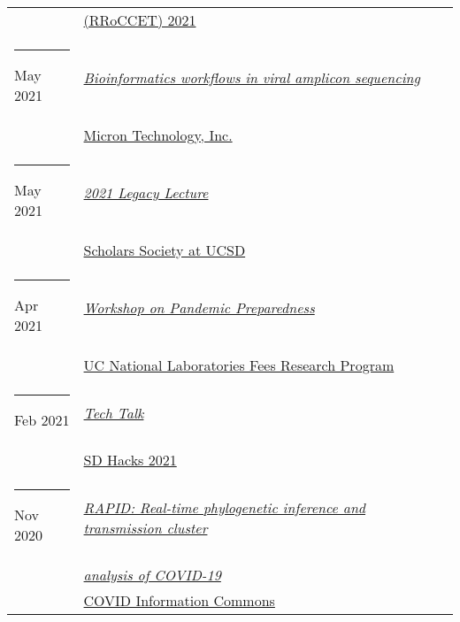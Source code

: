 \documentclass[margin,line]{res}
\begin{document}
\begin{resume}
\begin{longtable}{@{}p{0.7in}p{4in}}
\hspace*{-4mm} & \hspace{4mm} \href{https://na.eventscloud.com/website/23042/}{(RRoCCET) 2021}\\
\hspace*{-4mm} \rule{-1mm}{5mm} May 2021 & \href{https://www.micron.com/}{\textit{Bioinformatics workflows in viral amplicon sequencing}}\\*
\hspace*{-4mm} & \hspace{4mm} \href{https://www.micron.com/}{Micron Technology, Inc.}\\
\hspace*{-4mm} \rule{-1mm}{5mm} May 2021 & \href{https://studentorg.ucsd.edu/Home/Details/12340}{\textit{2021 Legacy Lecture}}\\*
\hspace*{-4mm} & \hspace{4mm} \href{https://studentorg.ucsd.edu/Home/Details/12340}{Scholars Society at UCSD}\\
\hspace*{-4mm} \rule{-1mm}{5mm} Apr 2021 & \href{https://www.ucop.edu/research-initiatives/programs/lab-fees/workshops.html}{\textit{Workshop on Pandemic Preparedness}}\\*
\hspace*{-4mm} & \hspace{4mm} \href{https://www.ucop.edu/research-initiatives/programs/lab-fees/index.html}{UC National Laboratories Fees Research Program}\\
\hspace*{-4mm} \rule{-1mm}{5mm} Feb 2021 & \href{https://www.sdhacks.io/}{\textit{Tech Talk}}\\*
\hspace*{-4mm} & \hspace{4mm} \href{https://www.sdhacks.io/}{SD Hacks 2021}\\
\hspace*{-4mm} \rule{-1mm}{5mm} Nov 2020 & \href{https://www.youtube.com/watch?v=6-fDbTY8ySI}{\textit{RAPID: Real-time phylogenetic inference and transmission cluster}}\\*
\hspace*{-4mm} & \hspace{4mm} \href{https://www.youtube.com/watch?v=6-fDbTY8ySI}{\textit{analysis of COVID-19}}\\*
\hspace*{-4mm} & \hspace{4mm} \href{https://covidinfocommons.datascience.columbia.edu/}{COVID Information Commons}\\

\end{longtable}
\end{resume}
\end{document}

